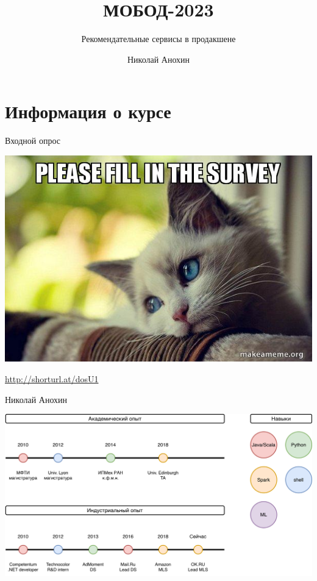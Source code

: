 \documentclass[11pt,aspectratio=169,handout]{beamer}
\author{Николай Анохин}
\title{МОБОД-2023}
\subtitle{Рекомендательные сервисы в продакшене}
\begin{document}
{

\begin{frame}
\titlepage
\end{frame}


}

\section{Информация о курсе}

\begin{frame}{Входной опрос}

\begin{center}
\includegraphics[scale=0.5]{images/please.jpeg}

\url{http://shorturl.at/dosU1}
\end{center}

\end{frame}

\begin{frame}{Николай Анохин}

\begin{center}
\includegraphics[scale=0.23]{images/about-me.png}
\end{center}

\end{frame}
\end{document}
